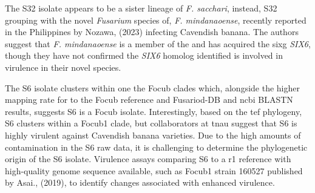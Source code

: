 The S32 isolate appears to be a sister lineage of \textit{F. sacchari}, instead, S32 grouping with the novel \textit{Fusarium} species of, \textit{F. mindanaoense}, recently reported in the Philippines by Nozawa, \et (2023) infecting Cavendish banana. The authors suggest that \textit{F. mindanaoense} is a member of the  and has acquired the \ac{sixg} \textit{SIX6}, though they have not confirmed the \textit{SIX6} homolog identified is involved in virulence in their novel species.

The S6 isolate clusters within one the \ac{Focub} clades which, alongside the higher mapping rate for to the \ac{Focub} reference and Fusariod-DB and \ac{ncbi} BLASTN results, suggests S6 is a \ac{Focub} isolate. Interestingly, based on the \ac{tef} phylogeny, S6 clusters within a \ac{Focub1} clade, but collaborators at \ac{tnau} suggest that S6 is highly virulent against Cavendish banana varieties. Due to the high amounts of contamination in the S6 raw data, it is challenging to determine the phylogenetic origin of the S6 isolate. Virulence assays comparing S6 to a \ac{r1} reference with high-quality genome sequence available, such as \ac{Focub1} strain 160527 published by Asai., \et (2019), to identify changes associated with enhanced virulence.

